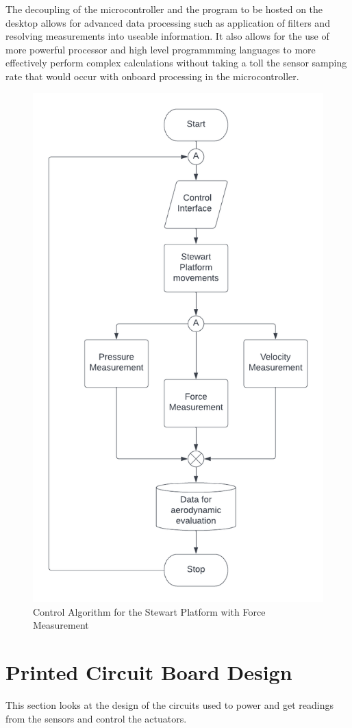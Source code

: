 The decoupling of the microcontroller and the program to be hosted on the desktop allows for advanced data processing such as application of filters and resolving measurements into useable information. It also allows for the use of more powerful processor and high level programmming languages to more effectively perform complex calculations without taking a toll the sensor samping rate that would occur with onboard processing in the microcontroller.
\begin{center}
	\begin{figure}[!h]
	\centering
	\includegraphics[width=0.7\linewidth]{Figures/Fig14}
	\caption[Control Algorithm]{Control Algorithm for the Stewart Platform with Force Measurement}
	\end{figure}
\end{center}
\section{Printed Circuit Board Design}
This section looks at the design of the circuits used to power and get readings from the sensors and control the actuators.

